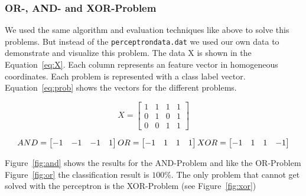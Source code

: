 \documentclass[subfigure,epsfig,fleqn,float,ausarbeitung]{scrartcl}
\begin{document}
\subsubsection{OR-, AND- and XOR-Problem}

We used the same algorithm and evaluation techniques like above to solve this problems. But instead of the \texttt{perceptrondata.dat} we used our own data to demonstrate and visualize this problem. The data X is shown in the Equation~\ref{eq:X}. Each column represents an feature vector in homogeneous coordinates. Each problem is represented with a class label vector. Equation~\ref{eq:prob} shows the vectors for the different problems.

\begin{equation}
X = 
	\begin{bmatrix}
     1  &   1  &   1   &  1\\
     0  &   1  &   0   &  1\\
     0  &   0  &   1   &  1
	\end{bmatrix}
	\label{eq:X}
\end{equation}

\begin{equation}
AND = 
	\begin{bmatrix}
     -1  &   -1  &   -1   &  1
	\end{bmatrix}
	\\
OR = 
	\begin{bmatrix}
     -1  &   1  &   1   &  1
	\end{bmatrix}
	\\
XOR = 
	\begin{bmatrix}
     -1  &   1  &   1   &  -1
	\end{bmatrix}
	\label{eq:prob}
\end{equation}

Figure~\ref{fig:and} shows the results for the AND-Problem and like the OR-Problem Figure~\ref{fig:or} the classification result is $100\%$. The only problem that cannot get solved with the perceptron is the XOR-Problem (see Figure~\ref{fig:xor}) 
\end{document}
